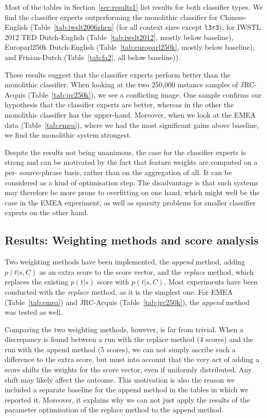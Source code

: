 \documentclass[smallextended]{svjour3}       %
\theoremstyle{break}
\begin{document}
Most of the tables in Section~\ref{sec:results1} list results for both classifier
types.  We find the classifier experts outperforming the monolithic classifier
for Chinese-English (Table~\ref{tab:iwslt2006zhen} (for all context sizes except
\texttt{l3r3}), for  IWSTL 2012 TED Dutch-English (Table~\ref{tab:iwslt2012},
mostly below baseline), Europarl250k Dutch-English
(Table~\ref{tab:europarl250k}, mostly below baseline), and Frisian-Dutch
(Table~\ref{tab:fa2}, all below baseline)).

These results suggest that the classifier experts perform better than the
monolithic classifier. When looking at the two 250,000 instance samples of
JRC-Acquis (Table~\ref{tab:jrc250k}), we see a conflicting image. One sample
confirms our hypothesis that the classifier experts are better, whereas in the
other the monolithic classifier has the upper-hand. Moreover, when we look at
the EMEA data (Table~\ref{tab:emea}), where we had the most significant gains
above baseline, we find the monolithic system strongest. 

Despite the results not being unanimous, the case for the classifier experts is
strong and can be motivated by the fact that feature weights are computed on a per-
source-phrase basis, rather than on the aggregation of all. It can be considered as a
kind of optimisation step. The disadvantage is that such systems may therefore
be more prone to overfitting on one hand, which might well be the case in the
EMEA experiment, as well as sparsity problems for smaller classifier experts on
the other hand.



\subsection{Results: Weighting methods and score analysis}
\label{sec:weighting}

Two weighting methods have been implemented, the \emph{append} method, adding
$p(t|s,C)$ as an extra score to the score vector, and the \emph{replace}
method, which replaces the existing $p(t|s)$ score with $p(t|s,C)$. Most
experiments have been conducted with the \emph{replace} method, as it is the
simplest one. For EMEA (Table~\ref{tab:emea}) and JRC-Acquis
(Table~\ref{tab:jrc250k}), the \emph{append} method was tested as well.

Comparing the two weighting methods, however, is far from trivial. When a
discrepancy is found between a run with the replace method (4 scores) and the
run with the append method (5 scores), we can not simply ascribe such a
difference to the extra score, but must into account that the very act of
adding a score shifts the weights for the score vector, even if uniformly
distributed. Any shift may likely affect the outcome. This
motivation is also the reason we included a separate baseline for the append
method in the tables in which we reported it. Moreover, it explains why we can
not just apply the results of the parameter optimisation of the replace method
to the append method.
\end{document}
